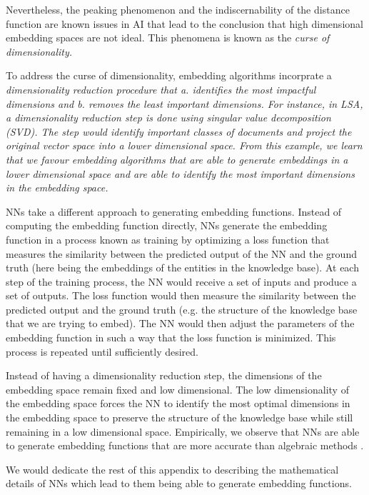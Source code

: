 Nevertheless, the
peaking phenomenon and the indiscernability of the distance function
are known issues in AI
that lead to the conclusion that high dimensional embedding spaces are not ideal.
This phenomena is known as the \it{curse of dimensionality}.

To address the curse of dimensionality, embedding algorithms incorprate
a \it{dimensionality reduction} procedure that a. identifies the most impactful dimensions and 
b. removes the least important dimensions.
For instance, in LSA, a dimensionality reduction step is done using singular value decomposition (SVD).
The step would identify important classes of documents and project the original 
vector space into a lower dimensional space. From this example, we learn that we favour embedding algorithms that are able to generate embeddings in a lower dimensional space
and are able to identify the most important dimensions in the embedding space.

NNs take a different approach to generating embedding functions.
Instead of computing the embedding function directly, NNs generate the embedding function in a process known as training
by optimizing a loss function that measures the similarity between the predicted output of the NN and the ground truth
(here being the embeddings of the entities in the knowledge base).
At each step of the training process, the NN would
receive a set of inputs and produce a set of outputs. The loss function would then measure the similarity between the predicted output and the ground truth
(e.g. the structure of the knowledge base that we are trying to embed).
The NN would then adjust the parameters of the embedding function in such a way that the loss function is minimized.
This process is repeated until sufficiently desired.

Instead of having a dimensionality reduction step, the dimensions of the embedding space remain fixed and low dimensional.
The low dimensionality of the embedding space forces the NN to identify the most optimal dimensions in the embedding space
to preserve the structure of the knowledge base while still remaining in a low dimensional space.
Empirically, we observe that NNs are able to generate embedding functions that are more accurate than algebraic methods \cite{FirstPaperOnAIEmbeddings}.

We would dedicate the rest of this appendix to describing the mathematical details of NNs which lead to them being able to generate embedding functions.
